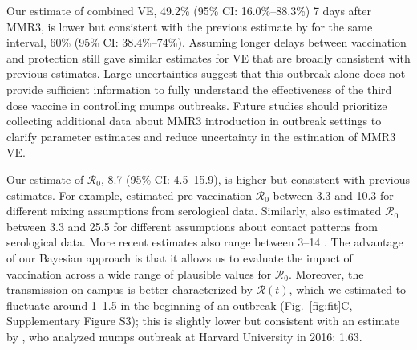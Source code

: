 \documentclass[12pt]{article}
\newcommand{\fref}[1]{Fig.~\ref{fig:#1}}
\begin{document}
Our estimate of combined VE, 49.2\% (95\% CI: 16.0\%--88.3\%) 7 days after MMR3, is lower but consistent with the previous estimate by \cite{cardemil2017effectiveness} for the same interval, 60\% (95\% CI: 38.4\%--74\%).
Assuming longer delays between vaccination and protection still gave similar estimates for VE that are broadly consistent with previous estimates.
Large uncertainties suggest that this outbreak alone does not provide sufficient information to fully understand the effectiveness of the third dose vaccine in controlling mumps outbreaks.
Future studies should prioritize collecting additional data about MMR3 introduction in outbreak settings to clarify parameter estimates and reduce uncertainty in the estimation of MMR3 VE.

Our estimate of $\mathcal R_0$, 8.7 (95\% CI: 4.5--15.9), is higher but consistent with previous estimates.
For example, \cite{edmunds2000pre} estimated pre-vaccination $\mathcal R_0$ between 3.3 and 10.3 for different mixing assumptions from serological data.
Similarly, \cite{farrington2001estimation} also estimated $\mathcal R_0$ between 3.3 and 25.5 for different assumptions about contact patterns from serological data.
More recent estimates also range between 3--14 \citep{majumder2017vaccine,lewnard2018vaccine}.
The advantage of our Bayesian approach is that it allows us to evaluate the impact of vaccination across a wide range of plausible values for $\mathcal R_0$.
Moreover, the transmission on campus is better characterized by $\mathcal R (t)$, which we estimated to fluctuate around 1--1.5 in the beginning of an outbreak (\fref{fit}C, Supplementary Figure S3);
this is slightly lower but consistent with an estimate by \cite{shah2022containing}, who analyzed mumps outbreak at Harvard University in 2016: 1.63.
\end{document}
